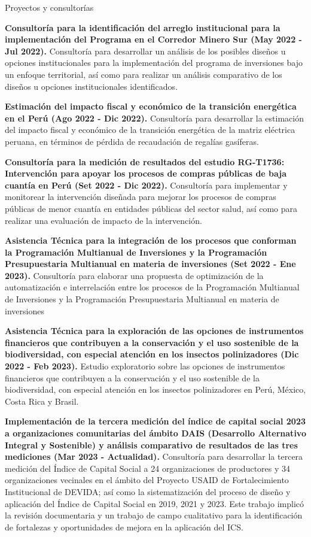 \documentclass{resume} %
\begin{document}
\pagebreak
\begin{rSection}{Proyectos y consultorías}
\item \textbf{Consultoría para la identificación del arreglo institucional para la implementación del Programa en el Corredor Minero Sur (May 2022 - Jul 2022).} {Consultoría para desarrollar un análisis de los posibles diseños u opciones institucionales para la implementación del programa de inversiones bajo un enfoque territorial, así como para realizar un análisis comparativo de los diseños u opciones institucionales identificados.}
\item \textbf{Estimación del impacto fiscal y económico de la transición energética en el Perú (Ago 2022 - Dic 2022).} {Consultoría para desarrollar la estimación del impacto fiscal y económico de la transición energética de la matriz eléctrica peruana, en términos de pérdida de recaudación de regalías gasíferas.}
\item \textbf{Consultoría para la medición de resultados del estudio RG-T1736: Intervención para apoyar los procesos de compras públicas de baja cuantía en Perú (Set 2022 - Dic 2022).} {Consultoría para implementar y monitorear la intervención diseñada para mejorar los procesos de compras públicas de menor cuantía en entidades públicas del sector salud, así como para realizar una evaluación de impacto de la intervención.}
\item \textbf{Asistencia Técnica para la integración de los procesos que conforman la Programación Multianual de Inversiones y la Programación Presupuestaria Multianual en materia de inversiones (Set 2022 - Ene 2023).} {Consultoría para elaborar una propuesta de optimización de la automatización e interrelación entre los procesos de la Programación Multianual de Inversiones y la Programación Presupuestaria Multianual en materia de inversiones}
\item \textbf{Asistencia Técnica para la exploración de las opciones de instrumentos financieros que contribuyen a la conservación y el uso sostenible de la biodiversidad, con especial atención en los insectos polinizadores (Dic 2022 - Feb 2023).} {Estudio exploratorio sobre las opciones de instrumentos financieros que contribuyen a la conservación y el uso sostenible de la biodiversidad, con especial atención en los insectos polinizadores en Perú, México, Costa Rica y Brasil.}
\item \textbf{Implementación de la tercera medición del índice de capital social 2023 a organizaciones comunitarias del ámbito DAIS (Desarrollo Alternativo Integral y Sostenible) y análisis comparativo de resultados de las tres mediciones (Mar 2023 - Actualidad).} {Consultoría para desarrollar la tercera medición del Índice de Capital Social a 24 organizaciones de productores y 34 organizaciones vecinales en el ámbito del Proyecto USAID de Fortalecimiento Institucional de DEVIDA; así como la sistematización del proceso de diseño y aplicación del Índice de Capital Social en 2019, 2021 y 2023. Este trabajo implicó la revisión documentaria y un trabajo de campo cualitativo para la identificación de fortalezas y oportunidades de mejora en la aplicación del ICS.}

\end{rSection}
\end{document}

